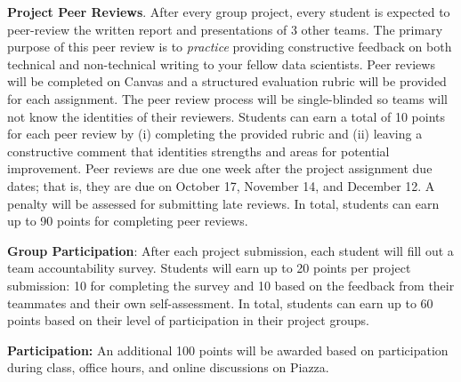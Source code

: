 \documentclass[11pt]{article}
\begin{document}
\textbf{Project Peer Reviews}. After every group project, every student is expected to peer-review the written report and presentations of 3 other teams. 
The primary purpose of this peer review is to \emph{practice} providing constructive feedback on both technical and non-technical writing to your fellow data scientists.
Peer reviews will be completed on Canvas and a structured evaluation rubric will be provided for each assignment. 
The peer review process will be single-blinded so teams will not know the identities of their reviewers.
Students can earn a total of 10 points for each peer review by (i) completing the provided rubric and (ii) leaving a constructive comment that identities strengths and areas for potential improvement.
Peer reviews are due one week after the project assignment due dates; that is, they are due on October 17, November 14, and December 12.
A penalty will be assessed for submitting late reviews.
In total, students can earn up to 90 points for completing peer reviews. 

\textbf{Group Participation}: After each project submission, each student will fill out a team accountability survey.
Students will earn up to 20 points per project submission: 10 for completing the survey and 10 based on the feedback from their teammates and their own self-assessment. 
In total, students can earn up to 60 points based on their level of participation in their project groups.

\textbf{Participation:} An additional 100 points will be awarded based on participation during class, office hours, and online discussions on Piazza.
\end{document}

